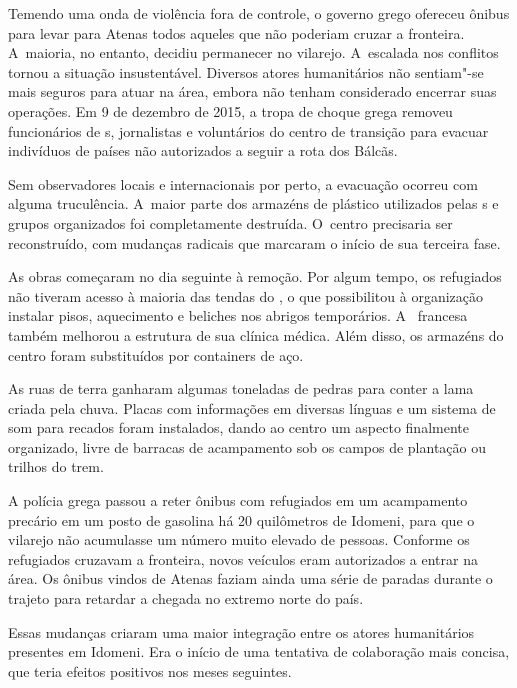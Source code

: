Temendo uma onda de violência fora de controle, o governo grego ofereceu
ônibus para levar para Atenas todos aqueles que não poderiam cruzar a
fronteira. A~maioria, no entanto, decidiu permanecer no vilarejo. A~escalada nos conflitos tornou a situação insustentável. Diversos atores
humanitários não sentiam"-se mais seguros para atuar na área, embora não
tenham considerado encerrar suas operações. Em 9 de dezembro de 2015, a
tropa de choque grega removeu funcionários de s, jornalistas e
voluntários do centro de transição para evacuar indivíduos de países não
autorizados a seguir a rota dos Bálcãs.

Sem observadores locais e internacionais por perto, a evacuação ocorreu
com alguma truculência. A~maior parte dos armazéns de plástico
utilizados pelas s e grupos organizados foi completamente destruída.
O~centro precisaria ser reconstruído, com mudanças radicais que marcaram
o início de sua terceira fase.

As obras começaram no dia seguinte à remoção. Por algum tempo, os
refugiados não tiveram acesso à maioria das tendas do , o que
possibilitou à organização instalar pisos, aquecimento e beliches nos
abrigos temporários. A~ francesa também melhorou a estrutura de sua
clínica médica. Além disso, os armazéns do centro foram substituídos por
containers de aço.

As ruas de terra ganharam algumas toneladas de pedras para conter a lama
criada pela chuva. Placas com informações em diversas línguas e um
sistema de som para recados foram instalados, dando ao centro um aspecto
finalmente organizado, livre de barracas de acampamento sob os campos de
plantação ou trilhos do trem.

A polícia grega passou a reter ônibus com refugiados em um acampamento
precário em um posto de gasolina há 20 quilômetros de Idomeni, para que
o vilarejo não acumulasse um número muito elevado de pessoas. Conforme
os refugiados cruzavam a fronteira, novos veículos eram autorizados a
entrar na área. Os ônibus vindos de Atenas faziam ainda uma série de
paradas durante o trajeto para retardar a chegada no extremo norte do
país.

Essas mudanças criaram uma maior integração entre os atores humanitários
presentes em Idomeni. Era o início de uma tentativa de colaboração mais
concisa, que teria efeitos positivos nos meses seguintes.


